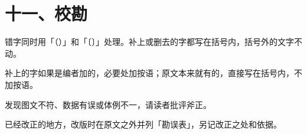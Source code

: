 \section*{十一、校勘}

\begin{fanli}
  \item 错字同时用「（）」和「〔〕」处理。补上或删去的字都写在括号内，括号外的文字不动。
  \item 补上的字如果是编者加的，必要处加按语；原文本来就有的，直接写在括号内，不加按语。
  \item 发现图文不符、数据有误或体例不一，请读者批评斧正。
  \item 已经改正的地方，改版时在原文之外并列「勘误表」，另记改正之处和依据。
\end{fanli}
